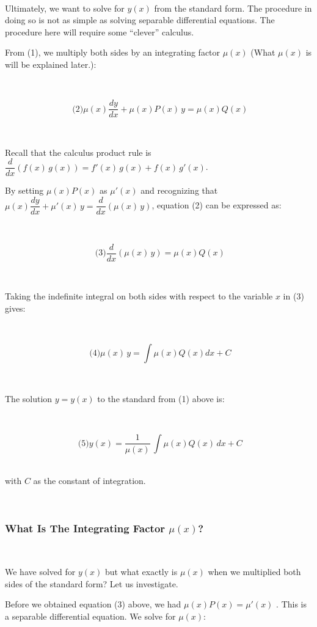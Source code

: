\documentclass[]{article}
\begin{document}
~

Ultimately, we want to solve for \(y(x)\) from the standard form. The
procedure in doing so is not as simple as solving separable differential
equations. The procedure here will require some ``clever'' calculus.

From (1), we multiply both sides by an integrating factor \(\mu(x)\)
(What \(\mu(x)\) is will be explained later.):

~

\[\text{ (2)}\displaystyle \mu(x) \dfrac{dy}{dx} + \mu(x) P(x) \, y = \mu(x) Q(x)\]

~

Recall that the calculus product rule is
\(\dfrac{d}{dx}(f(x) \, g(x)) = f'(x) \, g(x) + f(x) \, g'(x)\).

By setting \(\mu(x) P(x)\) as \(\mu'(x)\) and recognizing that
\(\mu(x) \dfrac{dy}{dx} + \mu'(x) \, y = \dfrac{d}{dx}(\mu(x) \, y)\),
equation (2) can be expressed as:

~

\[\text{ (3)} \displaystyle \dfrac{d}{dx}( \mu(x) \, y ) = \mu(x) Q(x)\]

~

Taking the indefinite integral on both sides with respect to the
variable \(x\) in (3) gives:

~

\[\text{ (4)}\displaystyle \mu(x) \, y = \int \mu(x) Q(x) dx + C\]

~

The solution \(y = y(x)\) to the standard from (1) above is:

~

\[\text{ (5)}\displaystyle y(x) = \dfrac{1}{\mu(x)} \, \int \mu(x) Q(x) \, dx + C\]
~

with \(C\) as the constant of integration.

~

\subsubsection{\texorpdfstring{What Is The Integrating Factor
\(\mu(x)\)?}{What Is The Integrating Factor \textbackslash{}mu(x)?}}\label{what-is-the-integrating-factor-mux}

~

We have solved for \(y(x)\) but what exactly is \(\mu(x)\) when we
multiplied both sides of the standard form? Let us investigate.

Before we obtained equation (3) above, we had \(\mu(x) P(x) = \mu'(x)\)
. This is a separable differential equation. We solve for \(\mu(x)\):
\end{document}
